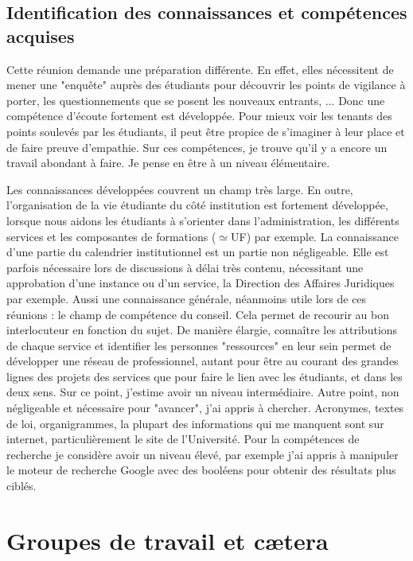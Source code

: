 \documentclass{article}
\begin{document}
\subsection{Identification des connaissances et compétences acquises}
Cette réunion demande une préparation différente. 
En effet, elles nécessitent de mener une "enquête" auprès des étudiants pour découvrir les points de vigilance à porter, les questionnements que se posent les nouveaux entrants, ... 
Donc une compétence d'écoute fortement est développée. 
Pour mieux voir les tenants des points soulevés par les étudiants, il peut être propice de s'imaginer à leur place et de faire preuve d'empathie. 
Sur ces compétences, je trouve qu'il y a encore un travail abondant à faire. 
Je pense en être à un niveau élémentaire. \par 
Les connaissances développées couvrent un champ très large. 
En outre, l'organisation de la vie étudiante du côté institution est fortement développée, lorsque nous aidons les étudiants à s'orienter dans l'administration, les différents services et les composantes de formations ($\simeq$UF) par exemple. 
La connaissance d'une partie du calendrier institutionnel est un partie non négligeable. 
Elle est parfois nécessaire lors de discussions à délai très contenu, nécessitant une approbation d'une instance ou d'un service, la Direction des Affaires Juridiques par exemple.
Aussi une connaissance générale, néanmoins utile lors de ces réunions : le champ de compétence du conseil. 
Cela permet de recourir au bon interlocuteur en fonction du sujet. 
De manière élargie, connaître les attributions de chaque service et identifier les personnes "ressources" en leur sein permet de développer une réseau de professionnel, autant pour être au courant des grandes lignes des projets des services que pour faire le lien avec les étudiants, et dans les deux sens. Sur ce point, j'estime avoir un niveau intermédiaire.
Autre point, non négligeable et nécessaire pour "avancer", j'ai appris à chercher. 
Acronymes, textes de loi, organigrammes, la plupart des informations qui me manquent sont sur internet, particulièrement le site de l'Université. 
Pour la compétences de recherche je considère avoir un niveau élevé, par exemple j'ai appris à manipuler le moteur de recherche Google avec des booléens pour obtenir des résultats plus ciblés.

\newpage

\section{Groupes de travail et cætera}
\end{document}
